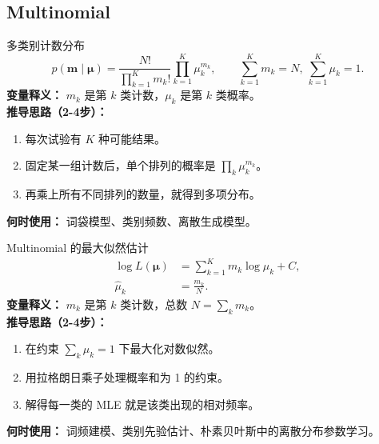 \documentclass[11pt]{article}
\begin{document}
\subsection{Multinomial}
\begin{formulabox}{多类别计数分布}
\begin{equation}
p(\mathbf{m}\mid \boldsymbol{\mu})
=\frac{N!}{\prod_{k=1}^{K}m_k!}\prod_{k=1}^{K}\mu_k^{m_k},
\qquad \sum_{k=1}^{K}m_k=N,\ \sum_{k=1}^{K}\mu_k=1.
\end{equation}
\textbf{变量释义：} $m_k$ 是第 $k$ 类计数，$\mu_k$ 是第 $k$ 类概率。\\
\textbf{推导思路（2-4步）：}
\begin{enumerate}[leftmargin=1.6em]
  \item 每次试验有 $K$ 种可能结果。
  \item 固定某一组计数后，单个排列的概率是 $\prod_k \mu_k^{m_k}$。
  \item 再乘上所有不同排列的数量，就得到多项分布。
\end{enumerate}
\textbf{何时使用：} 词袋模型、类别频数、离散生成模型。
\end{formulabox}

\begin{formulabox}{Multinomial 的最大似然估计}
\begin{align}
\log L(\boldsymbol\mu)
&= \sum_{k=1}^{K} m_k \log \mu_k + C,\\
\hat\mu_k &= \frac{m_k}{N}.
\end{align}
\textbf{变量释义：} $m_k$ 是第 $k$ 类计数，总数 $N=\sum_k m_k$。\\
\textbf{推导思路（2-4步）：}
\begin{enumerate}[leftmargin=1.6em]
\item 在约束 $\sum_k \mu_k=1$ 下最大化对数似然。
\item 用拉格朗日乘子处理概率和为 1 的约束。
\item 解得每一类的 MLE 就是该类出现的相对频率。
\end{enumerate}
\textbf{何时使用：} 词频建模、类别先验估计、朴素贝叶斯中的离散分布参数学习。
\end{formulabox}
\end{document}
